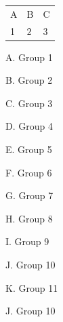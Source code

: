 \documentclass{article}
\begin{document}
\begin{abstract}
Test
  
Abstract
\end{abstract}

\begin{table}
{\begin{tabular}{lll}
  A & B & C\\
  1 & $2$ & 3
 \end{tabular}
}
\end{table}

\newcommand\test{Outer}

{
  \renewcommand\test{Group 1}
  A. \test
  \par

  {
    \renewcommand\test{Group 2}
    B. \test
    \par

    {
      \renewcommand\test{Group 3}
      C. \test
      \par

      {
        \renewcommand\test{Group 4}
        D. \test
        \par

        {
          \renewcommand\test{Group 5}
          E. \test
          \par

          {
            \renewcommand\test{Group 6}
            F. \test
            \par

            {
              \renewcommand\test{Group 7}
              G. \test
              \par

              {
                \renewcommand\test{Group 8}
                H. \test
                \par

                {
                  \renewcommand\test{Group 9}
                  I. \test
                  \par

                  {
                    \renewcommand\test{Group 10}
                    J. \test
                    \par

                    {
                      \renewcommand\test{Group 11}
                      K. \test
                      \par
                    }

                    J. \test
                    \par
                  }

}}}}}}}}}
\end{document}
